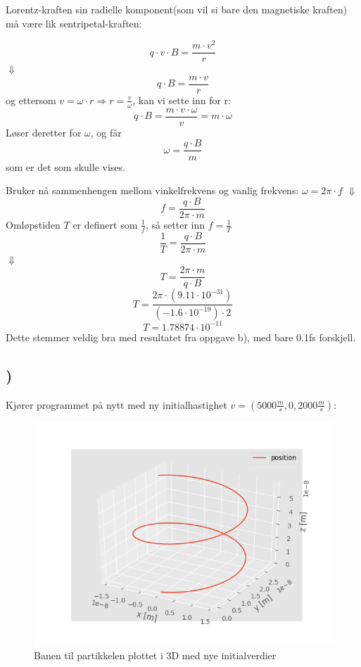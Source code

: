 \documentclass[report,12pt,norsk]{article}
\begin{document}
\begin{center}
Lorentz-kraften sin radielle komponent(som vil si bare den magnetiske kraften) må være lik sentripetal-kraften:

\[q \cdot v \cdot B = \frac{m \cdot v^{2}}{r}\]
$\Downarrow$
\[q \cdot B = \frac{m \cdot v}{r}\]
og ettersom $v = \omega \cdot r \Rightarrow r = \frac{v}{\omega}$, kan vi sette inn for r:
\[q \cdot B = \frac{m \cdot v \cdot \omega}{v} = m \cdot \omega\]
Løser deretter for $\omega$, og får
\[\omega = \frac{q \cdot B}{m}\]
som er det som skulle vises.

Bruker nå sammenhengen mellom vinkelfrekvens og vanlig frekvens: $\omega = 2\pi \cdot f$
$\Downarrow$
\[f = \frac{q \cdot B}{2\pi \cdot m}\]
Omløpstiden $T$ er definert som $\frac{1}{f}$, så setter inn $ f = \frac{1}{T}$
\[\frac{1}{T} = \frac{q \cdot B}{2\pi \cdot m}\]
$\Downarrow$
\[T = \frac{2\pi \cdot m}{q \cdot B}\]
\[T = \frac{2\pi \cdot (9.11 \cdot 10^{-31})}{(-1.6 \cdot 10^{-19}) \cdot 2}\]
\[T = 1.78874 \cdot 10^{-11}\]
Dette stemmer veldig bra med resultatet fra oppgave b), med bare 0.1fs forskjell.
\end{center}

\subsection{)}
Kjører programmet på nytt med ny initialhastighet $v = (5000\frac{m}{s}, 0, 2000\frac{m}{s})$:
\begin{figure}[h!]
        \centering 
        \includegraphics[scale=0.7]{position_plot_2_3d.png}
        \caption{Banen til partikkelen plottet i 3D med nye initialverdier}
\end{figure}
\end{document}
